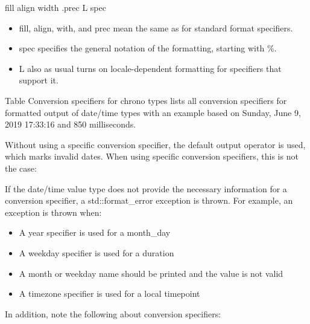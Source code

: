 \begin{shell}
fill align width .prec L spec
\end{shell}

\begin{itemize}
\item 
fill, align, with, and prec mean the same as for standard format specifiers.

\item 
spec specifies the general notation of the formatting, starting with \%.

\item 
L also as usual turns on locale-dependent formatting for specifiers that support it.
\end{itemize}

Table Conversion specifiers for chrono types lists all conversion specifiers for formatted output of date/time types with an example based on Sunday, June 9, 2019 17:33:16 and 850 milliseconds.

Without using a specific conversion specifier, the default output operator is used, which marks invalid dates. When using specific conversion specifiers, this is not the case:


If the date/time value type does not provide the necessary information for a conversion specifier, a std::format\_error exception is thrown. For example, an exception is thrown when:

\begin{itemize}
\item 
A year specifier is used for a month\_day

\item 
A weekday specifier is used for a duration

\item 
A month or weekday name should be printed and the value is not valid

\item 
A timezone specifier is used for a local timepoint
\end{itemize}

In addition, note the following about conversion specifiers:


